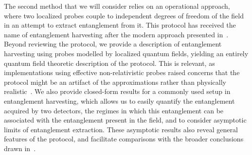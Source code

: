 \documentclass[letterpaper,12pt,titlepage,oneside,final]{book}
\begin{document}
The second method that we will consider relies on an operational approach, where two localized probes couple to independent degrees of freedom of the field in an attempt to extract entanglement from it. This protocol has received the name of entanglement harvesting after the modern approach presented in~\cite{Pozas-Kerstjens:2015}. Beyond reviewing the protocol, we provide a description of entanglement harvesting using probes modelled by localized quantum fields, yielding an entirely quantum field theoretic description of the protocol. This is relevant, as implementations using effective non-relativistic probes raised concerns that the protocol might be an artifact of the approximations rather than physically realistic~\cite{MaxHarvesting}. We also provide closed-form results for a commonly used setup in entanglement harvesting, which allows us to easily quantify the entanglement acquired by two detectors, the regimes in which this entanglement can be associated with the entanglement present in the field, and to consider asymptotic limits of entanglement extraction. These asymptotic results also reveal general features of the protocol, and facilitate comparisons with the broader conclusions drawn in~\cite{KlcoUVIR,KlcoEntStrQFTI,KlcoEntStrQFTII,KlcoEntAllDist}.
















\end{document}
